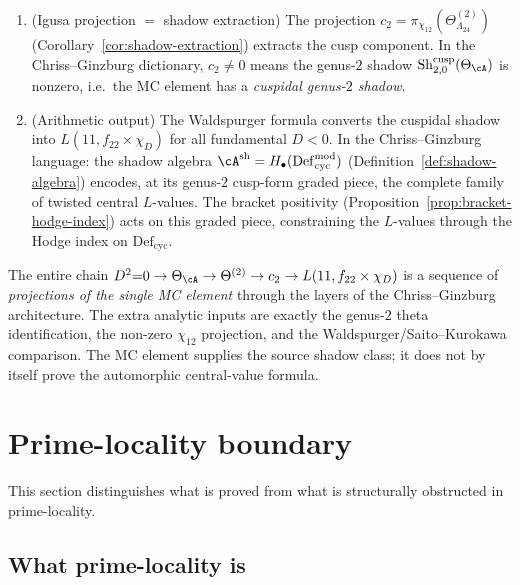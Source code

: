 \begin{remark}
\begin{enumerate}[label=\textup{(\roman*)}]
\item \textup{(Igusa projection $=$ shadow extraction)}
The projection
$c_2 = \pi_{\chi_{12}}(\Theta^{(2)}_{\Lambda_{24}})$
\textup{(}Corollary~\textup{\ref{cor:shadow-extraction}}\textup{)}
extracts the cusp component. In the Chriss--Ginzburg
dictionary, $c_2 \neq 0$ means the genus-$2$ shadow
$\mathrm{Sh}_{2,0}^{\mathrm{cusp}}(\Theta_\cA)$ is nonzero,
i.e.\ the MC element has a \emph{cuspidal genus-$2$ shadow}.

\item \textup{(Arithmetic output)}
The Waldspurger formula converts the cuspidal shadow into
$L(11, f_{22} \times \chi_D)$ for all fundamental $D < 0$.
In the Chriss--Ginzburg language: the shadow algebra
$\cA^{\mathrm{sh}} = H_\bullet(\mathrm{Def}_{\mathrm{cyc}}^{\mathrm{mod}})$
\textup{(}Definition~\textup{\ref{def:shadow-algebra}}\textup{)}
encodes, at its genus-$2$ cusp-form graded piece,
the complete family of twisted central $L$-values.
The bracket positivity
\textup{(}Proposition~\textup{\ref{prop:bracket-hodge-index}}\textup{)}
acts on this graded piece, constraining the $L$-values through
the Hodge index on $\mathrm{Def}_{\mathrm{cyc}}$.
\end{enumerate}
The entire chain
$D^2{=}0 \to \Theta_\cA \to \Theta^{(2)} \to c_2 \to
L(11, f_{22} \times \chi_D)$
is a sequence of \emph{projections of the single MC element}
through the layers of the Chriss--Ginzburg architecture.
The extra analytic inputs are exactly the genus-$2$ theta
identification, the non-zero $\chi_{12}$ projection, and the
Waldspurger/Saito--Kurokawa comparison. The MC element supplies the
source shadow class; it does not by itself prove the automorphic
central-value formula.
\end{remark}

\section{Prime-locality boundary}%
\label{sec:prime-locality-obstruction}%
%

This section distinguishes what is proved from what is
structurally obstructed in prime-locality.

\subsection{What prime-locality is}

